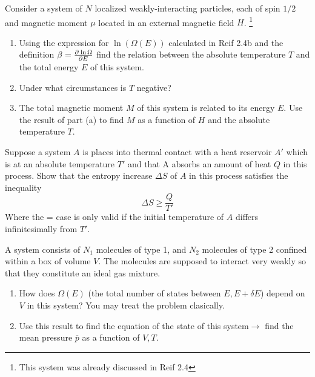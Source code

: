 \documentclass{article}
\begin{document}
    \begin{problem}[Reif 3.2]
        Consider a system of $N$ localized weakly-interacting particles, each of spin $1/2$ and magnetic moment $\mu$ located in an external magnetic field $H$. \footnote{This system was already discussed in Reif 2.4}
        \begin{enumerate}[label=(\alph*)]
            \item Using the expression for $\ln(\Omega(E))$ calculated in Reif 2.4b and the definition $\beta=\pder{\ln\Omega}{E}$ find the relation between the absolute temperature $T$ and the total energy $E$ of this system. 
            \item Under what circumstances is $T$ negative?
            \item The total magnetic moment $M$ of this system is related to its energy $E$. Use the result of part (a) to find $M$ as a function of $H$ and the absolute temperature $T$.
        \end{enumerate}
        \answerline
    \end{problem}\newpage
    \begin{problem}[Reif 3.4]
        Suppose a system $A$ is places into thermal contact with a heat reservoir $A'$ which is at an absolute temperature $T'$ and that A absorbs an amount of heat $Q$ in this process. Show that the entropy increase $\Delta S$ of $A$ in this process satisfies the inequality $$\Delta S \geq \frac{Q}{T'}$$ Where the = case is only valid if the initial temperature of $A$ differs infinitesimally from $T'$. 
        \answerline
    \end{problem}\newpage
    \begin{problem}[Reif 3.5]
        A system consists of $N_1$ molecules of type 1, and $N_2$ molecules of type 2 confined within a box of volume $V$. The molecules are supposed to interact very weakly so that they constitute an ideal gas mixture. 
        \begin{enumerate}[label=(\alph*)]
            \item How does $\Omega(E)$ (the total number of states between $E,E+\delta E$) depend on $V$ in this system? You may treat the problem clasically. 
            \item Use this result to find the equation of the state of this system$\rightarrow$ find the mean pressure $\overline{p}$ as a function of $V,T$.
        \end{enumerate}
        \answerline
    \end{problem}

    
\end{document}
